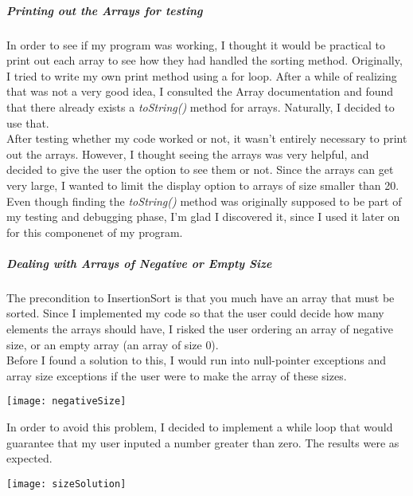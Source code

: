 \documentclass[12pt]{article}
\begin{document}
\subparagraph{Printing out the Arrays for testing}
In order to see if my program was working, I thought it would be practical to print out each array to see how they had handled the sorting method. Originally, I tried to write my own print method using a for loop. After a while of realizing that was not a very good idea, I consulted the Array documentation and found that there already exists a \textit{toString()} method for arrays. Naturally, I decided to use that. \\

After testing whether my code worked or not, it wasn't entirely necessary to print out the arrays. However, I thought seeing the arrays was very helpful, and decided to give the user the option to see them or not. Since the arrays can get very large, I wanted to limit the display option to arrays of size smaller than 20. Even though finding the \textit{toString()} method was originally supposed to be part of my testing and debugging phase, I'm glad I discovered it, since I used it later on for this componenet of my program.

\subparagraph{Dealing with Arrays of Negative or Empty Size}
The precondition to InsertionSort is that you much have an array that must be sorted. Since I implemented my code so that the user could decide how many elements the arrays should have, I risked the user ordering an array of negative size, or an empty array (an array of size 0). \\

Before I found a solution to this, I would run into null-pointer exceptions and array size exceptions if the user were to make the array of these sizes. 

\vspace*{.5in}
\texttt{[image: negativeSize]}

\vspace*{.5in}
In order to avoid this problem, I decided to implement a while loop that would guarantee that my user inputed a number greater than zero. The results were as expected. 

\vspace*{.5in}
\texttt{[image: sizeSolution]} 
\vspace*{.5in}
\end{document}
